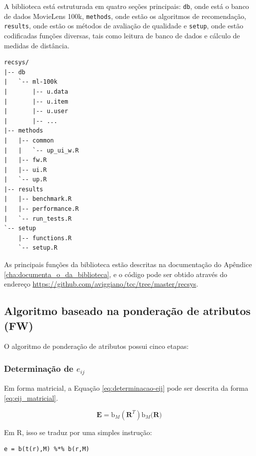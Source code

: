 A biblioteca está estruturada em quatro seções principais: \texttt{db}, onde está o banco de dados MovieLens 100k, \texttt{methods}, onde estão os algoritmos de recomendação, \texttt{results}, onde estão os métodos de avaliação de qualidade e \texttt{setup}, onde estão codificadas funções diversas, tais como leitura de banco de dados e cálculo de medidas de distância.

\begin{lstlisting}[caption=Estrutura da biblioteca]
recsys/
|-- db
|   `-- ml-100k
|       |-- u.data
|       |-- u.item
|       |-- u.user
|       |-- ...
|-- methods
|   |-- common
|   |   `-- up_ui_w.R
|   |-- fw.R
|   |-- ui.R
|   `-- up.R
|-- results
|   |-- benchmark.R
|   |-- performance.R
|   `-- run_tests.R
`-- setup
    |-- functions.R
    `-- setup.R
\end{lstlisting}

As principais funções da biblioteca estão descritas na documentação do Apêndice \ref{cha:documenta_o_da_biblioteca}, e o código pode ser obtido através do endereço \url{https://github.com/aviggiano/tcc/tree/master/recsys}.


\subsection{Algoritmo baseado na ponderação de atributos (FW)} %
\label{sub:algoritmo_baseado_na_pondera_o_de_atributos_fw_}

O algoritmo de ponderação de atributos possui cinco etapas: 

\subsubsection{Determinação de $e_{ij}$} %
\label{ssub:determina_o_de_e__ij_}

Em forma matricial, a Equação \ref{eq:determinacao-eij} pode ser descrita da forma \ref{eq:eij_matricial}.

\begin{equation}
\label{eq:eij_matricial}
\mathbf{E} = \mathrm{b}_M\left(\mathbf{R}^T\right) \mathrm{b}_M\big(\mathbf{R}\big)
\end{equation}

Em R, isso se traduz por uma simples instrução:

\begin{lstlisting}[caption=Determinação de $e_{ij}$]
e = b(t(r),M) %*% b(r,M)
\end{lstlisting}


